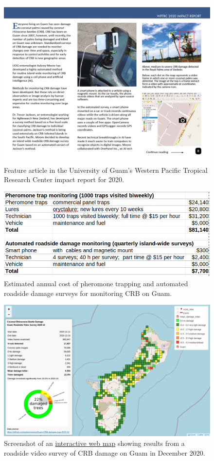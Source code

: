 \documentclass[11pt,english,letterpaper]{scrartcl}
\begin{document}
\begin{figure}[H]
	\centering
	\includegraphics[width=\linewidth]{images/impact-report08.png}
	\caption{Feature article in the University of Guam's Western Pacific Tropical Research Center impact report for 2020.}
	\label{fig:roadside1-2}
\end{figure}

\begin{figure}[H]
	\centering
	\includegraphics[width=0.7\linewidth]{images/pheromone-vs-roadside-costs}
	\caption{Estimated annual cost of pheromone trapping and automated roadside damage surveys for monitoring CRB on Guam.}
	\label{fig:pheromone-vs-roadside-costs}
\end{figure}

\begin{figure}[H]
	\centering
	\includegraphics[width=0.8\linewidth]{images/crb-webmap-2020-12.png}
	\caption{Screenshot of an \href{https://aubreymoore.github.io/Guam-CRB-damage-map-2020-12/webmap/v1}{interactive web map} showing results from a roadside video survey of	CRB damage on Guam in December 2020.}
	\label{fig:guam02}
\end{figure}
\end{document}
